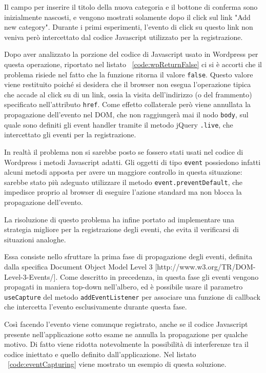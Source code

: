 \documentclass[12pt]{toptesi}
\begin{document}
Il campo per inserire il titolo della nuova categoria e il bottone di conferma sono inizialmente nascosti, e vengono mostrati solamente dopo il click sul link "Add new category". Durante i primi esperimenti, l'evento di click su questo link non veniva però intercettato dal codice Javascript utilizzato per la registrazione.

Dopo aver analizzato la porzione del codice di Javascript usato in Wordpress per questa operazione, riportato nel listato ~\ref{code:wpReturnFalse} ci si è accorti che il problema risiede nel fatto che la funzione ritorna il valore \verb|false|.
Questo valore viene restituito poiché si desidera che il browser non esegua l'operazione tipica che accade al click su di un link, ossia la visita dell'indirizzo (o del frammento) specificato nell'attributo \verb|href|. Come effetto collaterale però viene annullata la propagazione dell'evento nel DOM, che non raggiungerà mai il nodo \verb|body|, sul quale sono definiti gli event handler tramite il metodo jQuery \verb|.live|, che intercettato gli eventi per la registrazione.

In realtà il problema non si sarebbe posto se fossero stati usati nel codice di Wordpress i metodi Javascript adatti. Gli oggetti di tipo \verb|event| possiedono infatti alcuni metodi apposta per avere un maggiore controllo in questa situazione: sarebbe stato più adeguato utilizzare il metodo \verb|event.preventDefault|, che impedisce proprio al browser di eseguire l'azione standard ma non blocca la propagazione dell'evento.



La risoluzione di questo problema ha infine portato ad implementare una strategia migliore per la registrazione degli eventi, che evita il verificarsi di situazioni analoghe.

Essa consiste nello sfruttare la prima fase di propagazione degli eventi, definita dalla specifica Document Object Model Level 3 [http://www.w3.org/TR/DOM-Level-3-Events/]. Come descritto in precedenza, in questa fase gli eventi vengono propagati in maniera top-down nell'albero, ed è possibile usare il parametro \verb|useCapture| del metodo \verb|addEventListener| per associare una funzione di callback che intercetta l'evento esclusivamente durante questa fase.

Così facendo l'evento viene comunque registrato, anche se il codice Javascript presente nell'applicazione sotto esame ne annulla la propagazione per qualche motivo. Di fatto viene ridotta notevolmente la possibilità di interferenze tra il codice iniettato e quello definito dall'applicazione. Nel listato ~\ref{code:eventCapturing} viene mostrato un esempio di questa soluzione.


\end{document}
